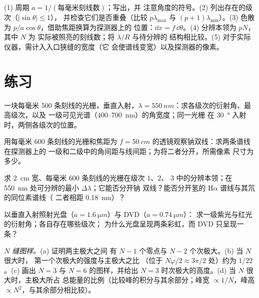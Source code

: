 \begin{method}[光栅计算]\label{met:b2:gratings:method}
(1) 周期 $a = 1/(\text{每毫米刻线数})$；写出，并
注意角度的符号。(2) 列出存在的级次（$|\sin\theta| \le 1$），
并检查它们是否重叠（比较 $p\lambda_{\max}$ 与 $(p + 1)\lambda_{\min}$）。(3)
色散为 $p/a\cos\theta$，借助焦距换算为探测器上的
位置：$\dd x = f\,\dd\theta$。(4) 分辨本领为 $pN$，其中 $N$ 为
实际被照亮的刻线数；将 $\lambda/R$ 与待分辨的
结构相比较。(5) 对于实际仪器，需计入入口狭缝的宽度（它
会使谱线变宽）以及探测器的像素。
\end{method}

\section{练习}

\begin{exercise}[$\star$]\label{exo:b2:gratings:1}
一块每毫米 $500$ 条刻线的光栅，垂直入射，$\lambda =
\qty{550}{nm}$：求各级次的衍射角、最高级次，以及
一级可见光谱（$400$--\qty{700}{nm}）的角宽度；同一光栅
在 \qty{30}{\degree} 入射时，两侧各级次的位置。
\end{exercise}

\begin{exercise}[$\star$]\label{exo:b2:gratings:2}
用每毫米 $600$ 条刻线的光栅和焦距为 $f =
\qty{50}{cm}$ 的透镜观察钠双线：求两条谱线在探测器上的
一级和二级中的角间距与线间距；为将二者分开，所需像素
尺寸为多少。
\end{exercise}

\begin{exercise}[$\star$]\label{exo:b2:gratings:3}
求 \qty{2}{cm} 宽、每毫米 $600$ 条刻线的光栅在级次 $1$、$2$、
$3$ 中的分辨本领；在 \qty{550}{nm} 处可分辨的最小 $\Delta\lambda$；它能否分开钠
双线？能否分开氢的 H$\alpha$ 谱线与其氘的同位素谱线（
二者相距 \qty{0.18}{nm}）？
\end{exercise}

\begin{exercise}[$\star$]\label{exo:b2:gratings:4}
以垂直入射照射光盘（$a = \qty{1.6}{\micro m}$）与 DVD（$a = \qty{0.74}{\micro m}$）：
求一级紫光与红光的衍射角；各自存在哪些级次；
为什么光盘呈现两条彩虹，而 DVD 只呈现一条？
\end{exercise}

\begin{exercise}[$\star\star$]\label{exo:b2:gratings:5}
\emph{$N$ 缝图样。}(a) 证明两主极大之间
有 $N - 1$ 个零点与 $N - 2$ 个次极大。(b) 当 $N$ 很大时，
第一个次极大的强度与主极大之比
（位于 $N\varphi/2 \approx 3\pi/2$ 处）约为 $1/22$。(c) 画出
$N = 3$ 与 $N = 6$ 的图样，并给出
$N = 3$ 时次极大的高度。(d) 当 $N$ 很大时，主极大所占
总能量的比例（比较峰的积分与其余部分；峰宽 $\propto 1/N$，峰高
$\propto N^2$，与其余部分相比较）。
\end{exercise}

